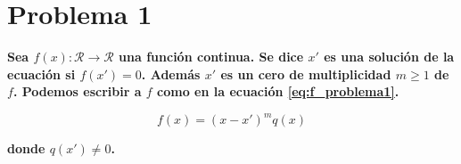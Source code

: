 \section*{Problema 1}

\textbf{Sea $f(x):\mathcal{R}\rightarrow\mathcal{R}$ una función continua. Se dice $x'$ es una solución de la ecuación si $f(x')=0$. Además $x'$ es un cero de multiplicidad $m\geq 1$ de $f$.  Podemos escribir a $f$ como en la ecuación \ref{eq:f_problema1}.}

\begin{equation}
    f(x)=(x-x')^mq(x) \label{eq:f_problema1}
\end{equation}

\textbf{donde $q(x')\neq 0$.}



